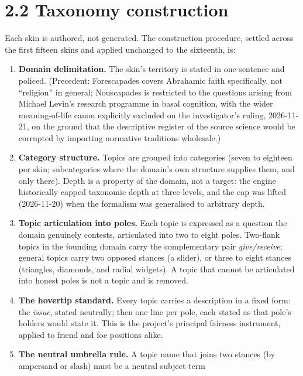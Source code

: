 \section{2.2 Taxonomy construction}\label{taxonomy-construction}

Each skin is authored, not generated. The construction procedure,
settled across the first fifteen skins and applied unchanged to the
sixteenth, is:

\begin{enumerate}
\def\labelenumi{\arabic{enumi}.}
\tightlist
\item
  \textbf{Domain delimitation.} The skin's territory is stated in one
  sentence and policed. (Precedent: Forescapades covers Abrahamic faith
  specifically, not ``religion'' in general; Nouscapades is restricted
  to the questions arising from Michael Levin's research programme in
  basal cognition, with the wider meaning-of-life canon explicitly
  excluded on the investigator's ruling, 2026-11-21, on the ground that
  the descriptive register of the source science would be corrupted by
  importing normative traditions wholesale.)
\item
  \textbf{Category structure.} Topics are grouped into categories (seven
  to eighteen per skin; subcategories where the domain's own structure
  supplies them, and only there). Depth is a property of the domain, not
  a target: the engine historically capped taxonomic depth at three
  levels, and the cap was lifted (2026-11-20) when the formalism was
  generalised to arbitrary depth.
\item
  \textbf{Topic articulation into poles.} Each topic is expressed as a
  question the domain genuinely contests, articulated into two to eight
  poles. Two-flank topics in the founding domain carry the complementary
  pair \emph{give/receive}; general topics carry two opposed stances (a
  slider), or three to eight stances (triangles, diamonds, and radial
  widgets). A topic that cannot be articulated into honest poles is not
  a topic and is removed.
\item
  \textbf{The hovertip standard.} Every topic carries a description in a
  fixed form: the \emph{issue}, stated neutrally; then one line per
  pole, each stated as that pole's holders would state it. This is the
  project's principal fairness instrument, applied to friend and foe
  positions alike.
\item
  \textbf{The neutral umbrella rule.} A topic name that joins two
  stances (by ampersand or slash) must be a neutral subject term

\end{enumerate}

